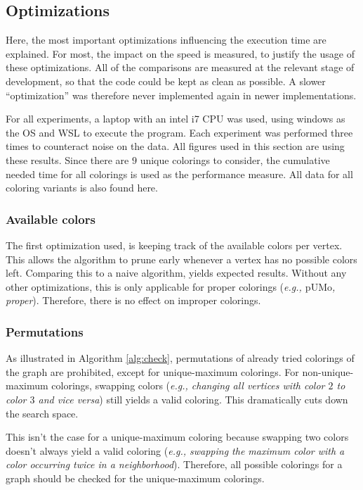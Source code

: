 \documentclass{article}
\begin{document}
\subsection{Optimizations}
\label{sec:optim}

Here, the most important optimizations influencing the execution time are explained. For most, the impact on the speed is measured, to justify the usage of these optimizations. All of the comparisons are measured at the relevant stage of development, so that the code could be kept as clean as possible. A slower ``optimization'' was therefore never implemented again in newer implementations.

For all experiments, a laptop with an intel i7 CPU was used, using windows as the OS and WSL to execute the program. Each experiment was performed three times to counteract noise on the data.
All figures used in this section are using these results. Since there are $9$ unique colorings to consider, the cumulative needed time for all colorings is used as the performance measure. All data for all coloring variants is also found here\footnotemark[1].

\subsubsection{Available colors}

The first optimization used, is keeping track of the available colors per vertex. This allows the algorithm to prune early whenever a vertex has no possible colors left. Comparing this to a naive algorithm, yields expected results. Without any other optimizations, this is only applicable for proper colorings (\textit{e.g., $\mathrm{pUMo}$, proper}). Therefore, there is no effect on improper colorings. 

\subsubsection{Permutations}

As illustrated in Algorithm \ref{alg:check}, permutations of already tried colorings of the graph are prohibited, except for unique-maximum colorings. For non-unique-maximum colorings, swapping colors (\textit{e.g., changing all vertices with color $2$ to color $3$ and vice versa}) still yields a valid coloring. This dramatically cuts down the search space. 

This isn't the case for a unique-maximum coloring because swapping two colors doesn't always yield a valid coloring (\textit{e.g., swapping the maximum color with a color occurring twice in a neighborhood}). Therefore, all possible colorings for a graph should be checked for the unique-maximum colorings. 
\end{document}
